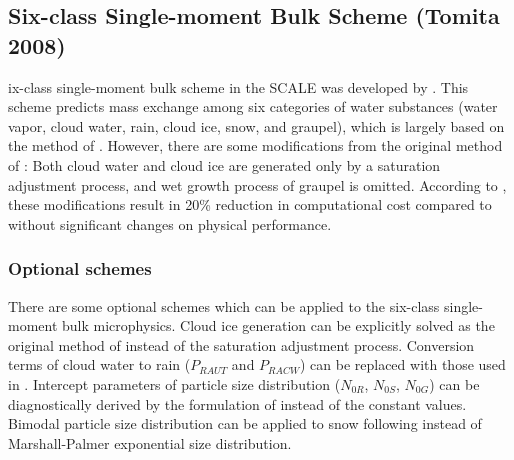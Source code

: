 \subsection{Six-class Single-moment Bulk Scheme (Tomita 2008)}
ix-class single-moment bulk scheme in the SCALE was developed by \citet{tomita_2008}. This scheme predicts mass exchange among six categories of water substances (water vapor, cloud water, rain, cloud ice, snow, and graupel), which is largely based on the method of \citet{lin_etal_1983}. However, there are some modifications from the original method of \citet{lin_etal_1983}: Both cloud water and cloud ice are generated only by a saturation adjustment process, and wet growth process of graupel is omitted. According to \citet{tomita_2008}, these modifications result in 20\% reduction in computational cost compared to \citet{lin_etal_1983} without significant changes on physical performance.

\subsubsection{Optional schemes}
There are some optional schemes which can be applied to the six-class single-moment bulk microphysics. Cloud ice generation can be explicitly solved as the original method of \citet{lin_etal_1983} instead of the saturation adjustment process. Conversion terms of cloud water to rain ($P_{RAUT}$ and $P_{RACW}$) can be replaced with those used in \citet{khairoutdinov_and_kogan_2000}. Intercept parameters of particle size distribution ($N_{0R}$, $N_{0S}$, $N_{0G}$) can be diagnostically derived by the formulation of \citet{wainwright_etal_2014} instead of the constant values. Bimodal particle size distribution can be applied to snow following \citet{roh_and_satoh_2007} instead of Marshall-Palmer exponential size distribution.
